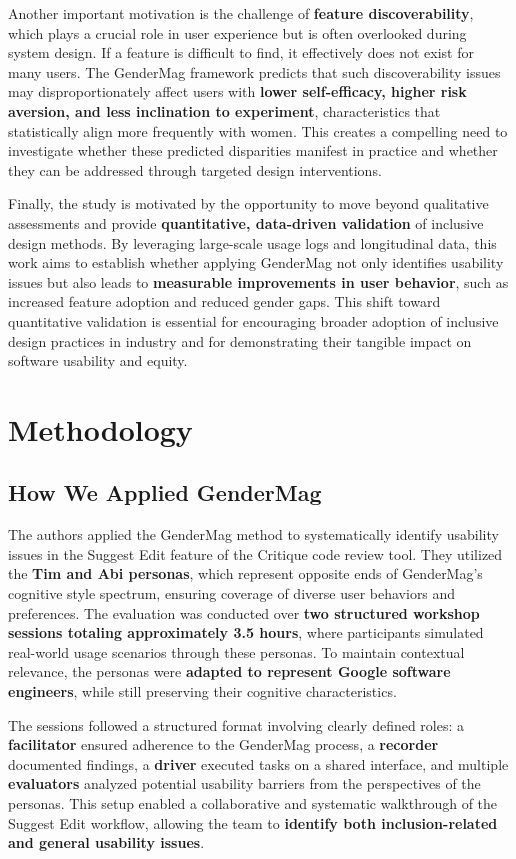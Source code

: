 Another important motivation is the challenge of \textbf{feature discoverability}, which plays a crucial role in user experience but is often overlooked during system design. If a feature is difficult to find, it effectively does not exist for many users. The GenderMag framework predicts that such discoverability issues may disproportionately affect users with \textbf{lower self-efficacy, higher risk aversion, and less inclination to experiment}, characteristics that statistically align more frequently with women. This creates a compelling need to investigate whether these predicted disparities manifest in practice and whether they can be addressed through targeted design interventions.

Finally, the study is motivated by the opportunity to move beyond qualitative assessments and provide \textbf{quantitative, data-driven validation} of inclusive design methods. By leveraging large-scale usage logs and longitudinal data, this work aims to establish whether applying GenderMag not only identifies usability issues but also leads to \textbf{measurable improvements in user behavior}, such as increased feature adoption and reduced gender gaps. This shift toward quantitative validation is essential for encouraging broader adoption of inclusive design practices in industry and for demonstrating their tangible impact on software usability and equity.

\section{Methodology}
\subsection{How We Applied GenderMag}
The authors applied the GenderMag method to systematically identify usability issues in the Suggest Edit feature of the Critique code review tool. They utilized the \textbf{Tim and Abi personas}, which represent opposite ends of GenderMag’s cognitive style spectrum, ensuring coverage of diverse user behaviors and preferences. The evaluation was conducted over \textbf{two structured workshop sessions totaling approximately 3.5 hours}, where participants simulated real-world usage scenarios through these personas. To maintain contextual relevance, the personas were \textbf{adapted to represent Google software engineers}, while still preserving their cognitive characteristics.

The sessions followed a structured format involving clearly defined roles: a \textbf{facilitator} ensured adherence to the GenderMag process, a \textbf{recorder} documented findings, a \textbf{driver} executed tasks on a shared interface, and multiple \textbf{evaluators} analyzed potential usability barriers from the perspectives of the personas. This setup enabled a collaborative and systematic walkthrough of the Suggest Edit workflow, allowing the team to \textbf{identify both inclusion-related and general usability issues}.

